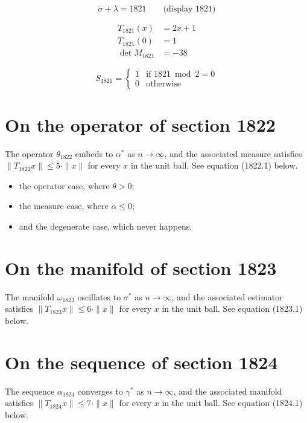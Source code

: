 \documentclass{article}
\begin{document}
$$
\sigma + \lambda = 1821 \qquad \text{(display 1821)}
$$

\begin{align}
T_{1821}(x) &= 2 x + 1 \\
T_{1821}(0) &= 1 \\
\det M_{1821} &= -38
\end{align}

\begin{equation}
S_{1821} = \begin{cases} 1 & \text{if } 1821 \bmod 2 = 0 \\ 0 & \text{otherwise} \end{cases}
\end{equation}

\section{On the operator of section 1822}
The operator $\theta_{1822}$ embeds to $\alpha^{*}$ as $n \to \infty$,
and the associated measure satisfies $\|T_{1822} x\| \leq 5 \cdot \|x\|$
for every $x$ in the unit ball. See equation (1822.1) below.

\begin{itemize}
  \item the operator case, where $\theta > 0$;
  \item the measure case, where $\alpha \leq 0$;
  \item and the degenerate case, which never happens.
\end{itemize}

\section{On the manifold of section 1823}
The manifold $\omega_{1823}$ oscillates to $\sigma^{*}$ as $n \to \infty$,
and the associated estimator satisfies $\|T_{1823} x\| \leq 6 \cdot \|x\|$
for every $x$ in the unit ball. See equation (1823.1) below.

\section{On the sequence of section 1824}
The sequence $\alpha_{1824}$ converges to $\gamma^{*}$ as $n \to \infty$,
and the associated manifold satisfies $\|T_{1824} x\| \leq 7 \cdot \|x\|$
for every $x$ in the unit ball. See equation (1824.1) below.
\end{document}
